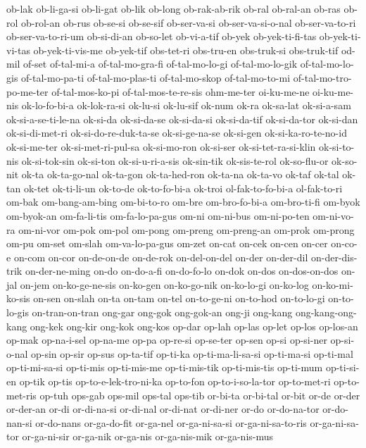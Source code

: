 {ob-lak ob-li-ga-si ob-li-gat ob-lik ob-long ob-rak-ab-rik ob-ral ob-ral-an
ob-ras ob-rol ob-rol-an ob-rus ob-se-si ob-se-sif ob-ser-va-si
ob-ser-va-si-o-nal ob-ser-va-to-ri ob-ser-va-to-ri-um ob-si-di-an
ob-so-let ob-vi-a-tif ob-yek ob-yek-ti-fi-tas ob-yek-ti-vi-tas
ob-yek-ti-vis-me ob-yek-tif obs-tet-ri obs-tru-en obs-truk-si obs-truk-tif
od-mil of-set of-tal-mi-a of-tal-mo-gra-fi of-tal-mo-lo-gi
of-tal-mo-lo-gik of-tal-mo-lo-gis of-tal-mo-pa-ti of-tal-mo-plas-ti
of-tal-mo-skop of-tal-mo-to-mi of-tal-mo-tro-po-me-ter of-tal-mos-ko-pi
of-tal-mos-te-re-sis ohm-me-ter oi-ku-me-ne oi-ku-me-nis ok-lo-fo-bi-a
ok-lok-ra-si ok-lu-si ok-lu-sif ok-num ok-ra ok-sa-lat ok-si-a-sam
ok-si-a-se-ti-le-na ok-si-da ok-si-da-se ok-si-da-si ok-si-da-tif
ok-si-da-tor ok-si-dan ok-si-di-met-ri ok-si-do-re-duk-ta-se
ok-si-ge-na-se ok-si-gen ok-si-ka-ro-te-no-id ok-si-me-ter
ok-si-met-ri-pul-sa ok-si-mo-ron ok-si-ser ok-si-tet-ra-si-klin
ok-si-to-nis ok-si-tok-sin ok-si-ton ok-si-u-ri-a-sis ok-sin-tik
ok-sis-te-rol ok-so-flu-or ok-so-nit ok-ta ok-ta-go-nal ok-ta-gon
ok-ta-hed-ron ok-ta-na ok-ta-vo ok-taf ok-tal ok-tan ok-tet ok-ti-li-un
ok-to-de ok-to-fo-bi-a ok-troi ol-fak-to-fo-bi-a ol-fak-to-ri om-bak
om-bang-am-bing om-bi-to-ro om-bre om-bro-fo-bi-a om-bro-ti-fi om-byok
om-byok-an om-fa-li-tis om-fa-lo-pa-gus om-ni om-ni-bus om-ni-po-ten
om-ni-vo-ra om-ni-vor om-pok om-pol om-pong om-preng om-preng-an om-prok
om-prong om-pu om-set om-slah om-va-lo-pa-gus om-zet on-cat on-cek on-cen
on-cer on-co-e on-com on-cor on-de-on-de on-de-rok on-del-on-del on-der
on-der-dil on-der-dis-trik on-der-ne-ming on-do on-do-a-fi on-do-fo-lo
on-dok on-dos on-dos-on-dos on-jal on-jem on-ko-ge-ne-sis on-ko-gen
on-ko-go-nik on-ko-lo-gi on-ko-log on-ko-mi-ko-sis on-sen on-slah on-ta
on-tam on-tel on-to-ge-ni on-to-hod on-to-lo-gi on-to-lo-gis
on-tran-on-tran ong-gar ong-gok ong-gok-an ong-ji ong-kang
ong-kang-ong-kang ong-kek ong-kir ong-kok ong-kos op-dar op-lah op-las
op-let op-los op-los-an op-mak op-na-i-sel op-na-me op-pa op-re-si
op-se-ter op-sen op-si op-si-ner op-si-o-nal op-sin op-sir op-sus
op-ta-tif op-ti-ka op-ti-ma-li-sa-si op-ti-ma-si op-ti-mal op-ti-mi-sa-si
op-ti-mis op-ti-mis-me op-ti-mis-tik op-ti-mis-tis op-ti-mum op-ti-si-en
op-tik op-tis op-to-e-lek-tro-ni-ka op-to-fon op-to-i-so-la-tor
op-to-met-ri op-to-met-ris op-tuh ops-gab ops-mil ops-tal ops-tib or-bi-ta
or-bi-tal or-bit or-de or-der or-der-an or-di or-di-na-si or-di-nal
or-di-nat or-di-ner or-do or-do-na-tor or-do-nan-si or-do-nans
or-ga-do-fit or-ga-nel or-ga-ni-sa-si or-ga-ni-sa-to-ris or-ga-ni-sa-tor
or-ga-ni-sir or-ga-nik or-ga-nis or-ga-nis-mik or-ga-nis-mus
}
